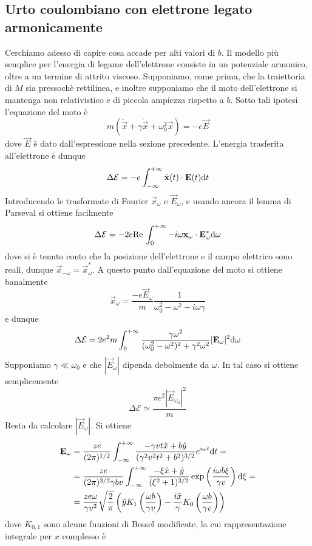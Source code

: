 \documentclass{article}
\begin{document}
\subsection{Urto coulombiano con elettrone legato armonicamente}
Cerchiamo adesso di capire cosa accade per alti valori di $b$. Il modello più semplice per l'energia di legame dell'elettrone consiste in un potenziale armonico, oltre a un termine di attrito viscoso. Supponiamo, come prima, che la traiettoria di $M$ sia pressochè rettilinea, e inoltre supponiamo che il moto dell'elettrone si mantenga non relativistico e di piccola ampiezza rispetto a $b$. Sotto tali ipotesi l'equazione del moto è
\[m(\ddot{\vec{x}}+\gamma\dot{\vec{x}}+\omega_0^2\vec{x})=-e\vec{E}\]
dove $\vec{E}$ è dato dall'espressione nella sezione precedente. L'energia trasferita all'elettrone è dunque
\[\Delta\mathcal{E}=-e\int_{-\infty}^{+\infty}\dot{\mathbf{x}}(t)\cdot\mathbf{E}(t)\mathrm{d} t\]
Introducendo le trasformate di Fourier $\vec{x}_\omega$ e $\vec{E}_\omega$, e usando ancora il lemma di Parseval si ottiene facilmente
\[\Delta\mathcal{E}=-2e\mathrm{Re}\,\int_{0}^{+\infty}-i\omega\mathbf{x}_\omega\cdot\mathbf{E}^*_\omega\mathrm{d}\omega\]
dove si è tenuto conto che la posizione dell'elettrone e il campo elettrico sono reali, dunque $\vec{x}_{-\omega}=\vec{x}^*_{\omega}$. A questo punto dall'equazione del moto si ottiene banalmente
\[\vec{x}_\omega=\frac{-e\vec{E}_\omega}{m}\frac{1}{\omega_0^2-\omega^2-i\omega\gamma}\]
e dunque
\[\Delta\mathcal{E}={2e^2}{m}\int_{0}^{+\infty}\frac{\gamma\omega^2}{(\omega_0^2-\omega^2)^2+\gamma^2\omega^2}|\mathbf{E}_\omega|^2\mathrm{d} \omega\]
Supponiamo $\gamma\ll\omega_0$ e che $|\vec{E}_\omega|$ dipenda debolmente da $\omega$. In tal caso si ottiene semplicemente
\[\Delta\mathcal{E}\simeq\frac{\pi e^2|\vec{E}_{\omega_0}|^2}{m}\]
Resta da calcolare $|\vec{E}_\omega|$. Si ottiene
\begin{align*}\mathbf{E}_\omega&=\frac{ze}{(2\pi)^{1/2}}\int_{-\infty}^{+\infty}\frac{-\gamma vt\hat{x}+b\hat{y}}{(\gamma^2v^2t^2+b^2)^{3/2}}e^{i\omega t}\mathrm{d} t=\\&=\frac{ze}{(2\pi)^{3/2}\gamma bv}\int_{-\infty}^{+\infty}\frac{-\xi\hat{x}+\hat{y}}{(\xi^2+1)^{3/2}}\exp\left(\frac{i\omega b\xi}{\gamma v}\right)\mathrm{d} \xi=\\&=\frac{ze\omega}{\gamma v^2}\sqrt{\frac{2}{\pi}}\left(\hat{y}K_1\left(\frac{\omega b}{\gamma v}\right)-\frac{i\hat{x}}{\gamma}K_0\left(\frac{\omega b}{\gamma v}\right)\right)\end{align*}
dove $K_{0,1}$ sono alcune funzioni di Bessel modificate, la cui rappresentazione integrale per $x$ complesso è
\end{document}

